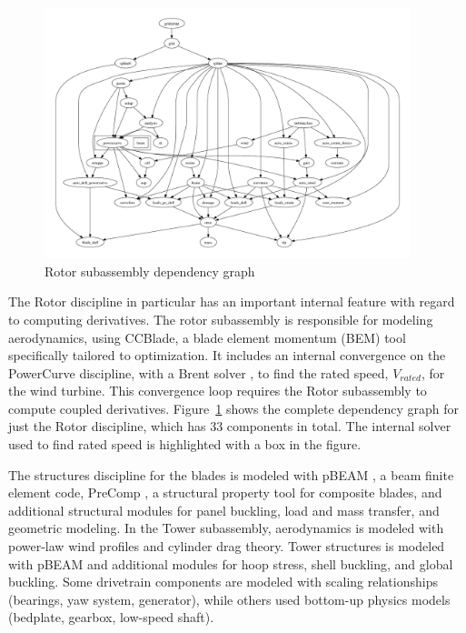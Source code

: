 \documentclass[]{aiaa-tc} %
\begin{document}
    \begin{figure}[!htbp]
        \centering
        \includegraphics[width=0.95\textwidth]{images/rotor_depgraph}
        \caption{Rotor subassembly dependency graph}
        \label{fig:wt_sub_depgraph}
    \end{figure}

    The Rotor discipline in particular has an important internal feature with regard to computing derivatives.
    The rotor subassembly is responsible for modeling aerodynamics, using CCBlade\cite{NING:BEM},
    a blade element momentum (BEM) tool specifically tailored to optimization. It includes
    an internal convergence on the PowerCurve discipline, with a Brent solver \cite{Brent1971}, to find the
    rated speed, $V_{rated}$, for the wind turbine. This convergence loop requires the Rotor
    subassembly to compute coupled derivatives. Figure~\ref{fig:wt_sub_depgraph} shows the complete
    dependency graph for just the Rotor discipline, which has 33 components in total.  The internal solver used to
    find rated speed is highlighted with a box in the figure.

    The structures discipline for the blades is modeled with pBEAM \cite{Ning2013b},
    a beam finite element code, PreComp \cite{Bir2005}, a structural property tool for
    composite blades, and additional structural modules for panel buckling, load and mass transfer, and geometric modeling. In the Tower subassembly,
    aerodynamics is modeled with power-law wind profiles and cylinder drag theory.
    Tower structures is modeled with pBEAM and additional modules for hoop stress, shell buckling,
    and global buckling.  Some drivetrain components are modeled with scaling
    relationships (bearings, yaw system, generator), while others used bottom-up physics
    models (bedplate, gearbox, low-speed shaft).
\end{document}
